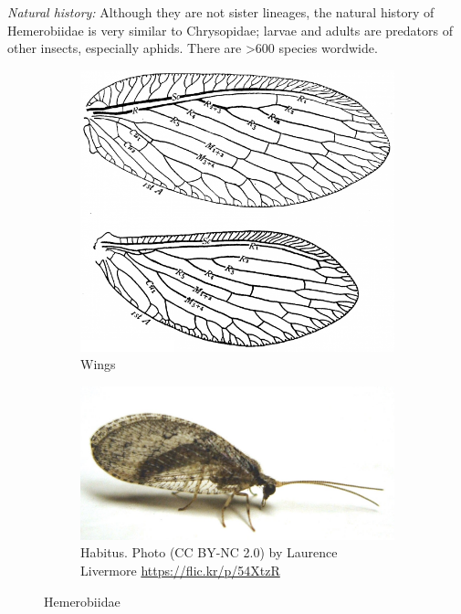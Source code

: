 \documentclass[letterpaper, 11pt]{article}
\begin{document}
\noindent{}\textit{Natural history:} Although they are not sister lineages, the natural history of Hemerobiidae is very similar to Chrysopidae; larvae and adults are predators of other insects, especially aphids. There are \textgreater{}600 species wordwide.

\begin{figure}[ht!]
    \centering
    \begin{subfigure}[ht!]{0.34\textwidth}
        \includegraphics[width=\textwidth]{figures/HemerobiidWing}
        \caption{Wings \citep[][Fig. 153]{comstock1918wings}}
        \label{fig:hemerobiid1}
    \end{subfigure}
    \qquad
    \begin{subfigure}[ht!]{0.5\textwidth}
        \includegraphics[width=\textwidth]{figures/HemerobiidHabitus}
        \caption{Habitus. Photo (CC BY-NC 2.0) by Laurence Livermore \url{https://flic.kr/p/54XtzR}}
        \label{fig:hemerobiid2}
    \end{subfigure}
    \caption{Hemerobiidae}\label{fig:hemerobiids}
\end{figure}
\end{document}
